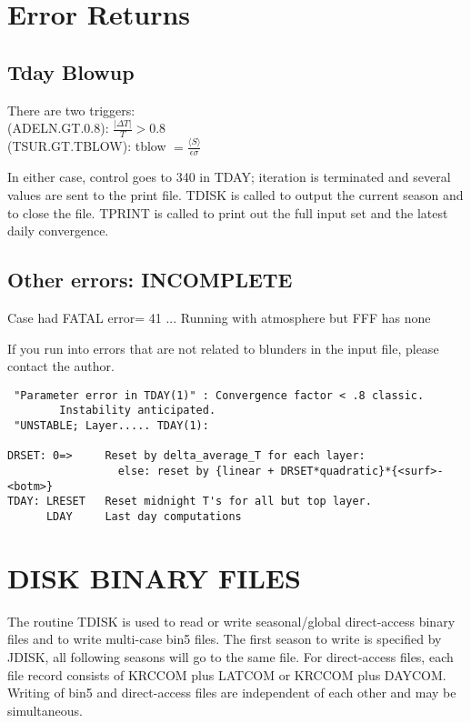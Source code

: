 \documentclass{article}
\newcommand{\qi}{\\ \hspace*{2.em}}      %
\begin{document}
\section{Error Returns} %
\subsection{Tday Blowup} %
There are two triggers:
\qi  (ADELN.GT.0.8):  $\frac{ | \Delta T |}{T} > 0.8$ 
\qi (TSUR.GT.TBLOW): tblow $= \frac{\langle S \rangle}{\epsilon \sigma}$

In either case, control goes to 340 in TDAY; iteration is terminated and several
values are sent to the print file. TDISK is called to output the current season
and to close the file. TPRINT is called to print out the full input set and the
latest daily convergence.

\subsection{Other errors: INCOMPLETE} %
Case had FATAL error=          41 ... Running with atmosphere but FFF has none 

If you run into errors that are not related to blunders in the input file,
please contact the author.
\vspace{-3.mm} 
\begin{verbatim}
 "Parameter error in TDAY(1)" : Convergence factor < .8 classic. 
        Instability anticipated.  
 "UNSTABLE; Layer..... TDAY(1): 

DRSET: 0=>     Reset by delta_average_T for each layer:
                 else: reset by {linear + DRSET*quadratic}*{<surf>-<botm>}
TDAY: LRESET   Reset midnight T's for all but top layer.
      LDAY     Last day computations
\end{verbatim}


\section{DISK BINARY FILES \label{dbf} } %

The routine TDISK is used to read or write seasonal/global direct-access binary
files and to write multi-case bin5 files. The first season to write is specified
by JDISK, all following seasons will go to the same file. For direct-access
files, each file record consists of KRCCOM plus LATCOM or KRCCOM plus
DAYCOM. Writing of bin5 and direct-access files are independent of each other
and may be simultaneous.
\end{document}
